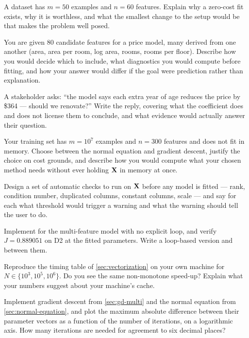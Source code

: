 \ap A dataset has $m = 50$ examples and $n = 60$ features. Explain why a
zero-cost fit exists, why it is worthless, and what the smallest change to the
setup would be that makes the problem well posed.


\dpr You are given $80$ candidate features for a price model, many derived from
one another (area, area per room, log area, rooms, rooms per floor). Describe how
you would decide which to include, what diagnostics you would compute before
fitting, and how your answer would differ if the goal were prediction rather than
explanation.

\dpr A stakeholder asks: ``the model says each extra year of age reduces the
price by \$364 --- should we renovate?'' Write the reply, covering what the
coefficient does and does not license them to conclude, and what evidence would
actually answer their question.

\dpr Your training set has $m = 10^{7}$ examples and $n = 300$ features and does
not fit in memory. Choose between the normal equation and gradient descent,
justify the choice on cost grounds, and describe how you would compute what your
chosen method needs without ever holding $\mathbf{X}$ in memory at once.

\dpr Design a set of automatic checks to run on $\mathbf{X}$ before any model is
fitted --- rank, condition number, duplicated columns, constant columns, scale
--- and say for each what threshold would trigger a warning and what the warning
should tell the user to do.


\pe Implement  for the multi-feature model with no
explicit loop, and verify $J = 0.889051$ on D2 at the fitted parameters. Write a
loop-based version and  between them.

\pe Reproduce the timing table of \cref{sec:vectorization} on your own machine
for $N \in \{10^3, 10^5, 10^6\}$. Do you see the same non-monotone speed-up?
Explain what your numbers suggest about your machine's cache.

\pe Implement gradient descent from \cref{sec:gd-multi} and the normal equation
from \cref{sec:normal-equation}, and plot the maximum absolute difference between
their parameter vectors as a function of the number of iterations, on a
logarithmic axis. How many iterations are needed for agreement to six decimal
places?

